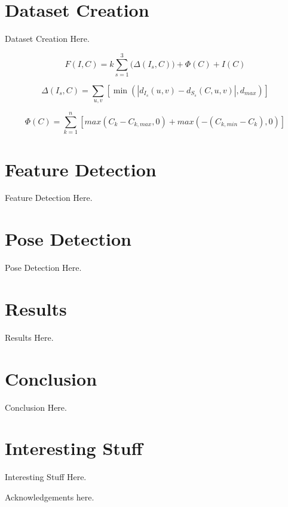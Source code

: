 \documentclass{acmtog}
\begin{document}
\section{Dataset Creation}
\label{sec:datasetcreation}

Dataset Creation Here.

\begin{equation}
F\left(I, C\right)=k\sum_{s=1}^3\bigg(\Delta(I_s, C)\bigg) + \Phi\left(C\right) + I\left(C\right)
\end{equation}

\begin{equation}
\Delta\left(I_s,C\right)=\sum_{u,v}\left[\operatorname{min}\left(\left|d_I_s(u,v)-d_S_s(C,u,v)\right|,d_{max}\right)\right]
\end{equation}

\begin{equation}
\Phi\left(C\right) = \sum_{k=1}^n\left[max\left(C_k-C_{k,max}, 0\right) + max\left(-\left(C_{k,min}-C_k\right), 0\right)\right]
\end{equation}

\section{Feature Detection}
\label{sec:realtimefeaturedetection}

Feature Detection Here.

\section{Pose Detection}
\label{sec:realtimeposedetection}

Pose Detection Here.

\section{Results}
\label{sec:results}

Results Here.

\section{Conclusion}
\label{sec:conclusion}

Conclusion Here.

\appendix

\section{Interesting Stuff}

Interesting Stuff Here.

\begin{acks}

Acknowledgements here.

\end{acks}




\end{document}

